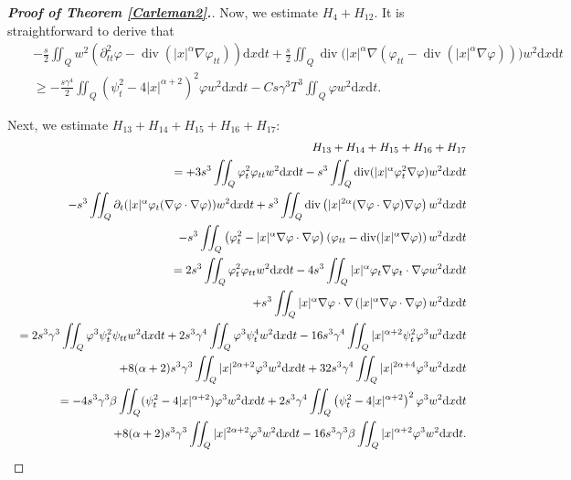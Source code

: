 \documentclass[11pt]{article}
\numberwithin{equation}{section}
\def\pt{\partial}
\def\vp{\varphi}
\def\bf{\textbf}
\def\pt{\partial}
\def\al{\alpha}
\def\be{\beta}
\def\ga{\gamma}
\def\f{\frac}
\def\df{\mathrm d}
\DeclareMathOperator{\Div}{div}
\begin{document}
\begin{proof}[{\rm \bf { Proof of  Theorem \ref{Carleman2}.}}]
			
			
			Now, we estimate $H_4+H_{12}$.  It is straightforward to derive that
			\begin{eqnarray*}
				&& -\f{s}{2}\iint_Q w^2\left(\pt_{tt}^2\vp -\Div(|x|^\al \nabla \vp_{tt})\right)\df x\df t+\f{s}{2}\iint_Q\Div\Big(|x|^\al \nabla  \left(\vp_{tt}-\Div (|x|^\al \nabla \vp)\right) \Big) w^2\df x\df t\\
				&&\geq -\f{s\ga^4}{2}\iint_Q(\psi_t^2-4|x|^{\al+2})^2\vp w^2\df x\df t-Cs\ga^3T^3\iint_Q \vp w^2\df x\df t.
			\end{eqnarray*}
			
			
			Next, we estimate  $H_{13}+H_{14}+H_{15}+H_{16}+H_{17}$:
			\begin{eqnarray*}
				&& H_{13}+H_{14}+H_{15}+H_{16}+H_{17}\\
				&& =+3s^3\iint_Q \vp_t^2\vp_{tt}w^2\df x\df t-s^3\iint_Q\Div(|x|^\al \vp_t^2\nabla \vp)w^2\df x\df t\\
				&&\hspace{4.5mm}-s^3\iint_Q\pt_t(|x|^\al \vp_t(\nabla \vp\cdot \nabla \vp))w^2\df x\df t+s^3\iint_Q\Div\left(|x|^{2\al}(\nabla\vp\cdot \nabla\vp)\nabla\vp\right)w^2\df x\df t\\
				&&\hspace{4.5mm} -s^3\iint_Q\left(\vp_t^2-|x|^\al \nabla\vp\cdot \nabla\vp\right) \left(\vp_{tt}-\Div (|x|^\al \nabla\vp)\right)w^2 \df x\df t\\
				&&=2s^3\iint_Q\vp_t^2\vp_{tt}w^2\df x\df t-4s^3\iint_Q|x|^\al \vp_t\nabla\vp_t\cdot \nabla \vp w^2\df x\df t\\
				&&\hspace{4.5mm}+s^3\iint_Q |x|^\al \nabla \vp\cdot \nabla \left(|x|^\al \nabla \vp\cdot \nabla \vp\right)w^2\df x\df t\\
				&&=2s^3\ga^3\iint_Q\vp^3\psi_t^2\psi_{tt}w^2\df x\df t+2s^3\ga^4\iint_Q\vp^3\psi_t^4w^2\df x\df t-16s^3\ga^4\iint_Q|x|^{\al+2}\psi_t^2\vp^3w^2\df x\df t\\
				&&\hspace{4.5mm}+8(\al+2)s^3\ga^3\iint_Q|x|^{2\al+2}\vp^3w^2\df x\df t+32s^3\ga^4\iint_Q|x|^{2\al+4}\vp^3w^2\df x\df t\\
				&&=-4s^3\ga^3\be\iint_Q (\psi_t^2-4|x|^{\al+2})\vp^3w^2\df x\df t+2s^3\ga^4\iint_Q\left(\psi_t^2-4|x|^{\al+2}\right)^2\vp^3w^2\df x\df t\\
				&&\hspace{4.5mm}+8(\al+2)s^3\ga^3\iint_Q|x|^{2\al+2}\vp^3w^2\df x\df t-16s^3\ga^3\be\iint_Q |x|^{\al+2}\vp^3w^2\df x\df t.
			\end{eqnarray*}
			

\end{proof}
\end{document}
